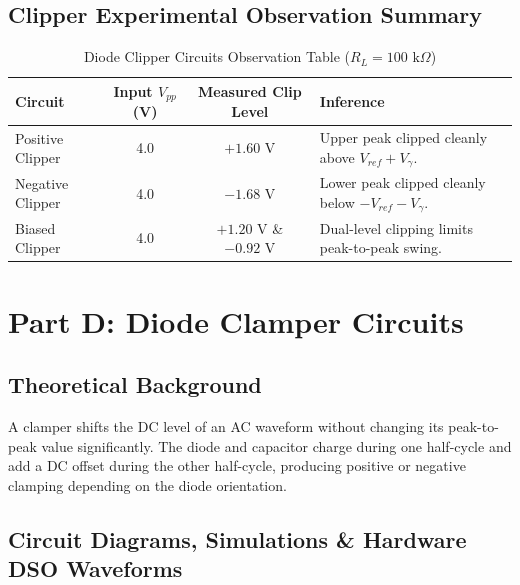 \documentclass[11pt,a4paper]{article}
\begin{document}
\subsection{Clipper Experimental Observation Summary}
\begin{table}[H]
\centering
\caption{Diode Clipper Circuits Observation Table ($R_L = 100\text{ k}\Omega$)}
\begin{tabular}{l c c l}
\toprule
\textbf{Circuit} & \textbf{Input $V_{pp}$ (V)} & \textbf{Measured Clip Level} & \textbf{Inference} \\
\midrule
Positive Clipper & 4.0 & $+1.60\text{ V}$ & Upper peak clipped cleanly above $V_{ref}+V_\gamma$. \\
Negative Clipper & 4.0 & $-1.68\text{ V}$ & Lower peak clipped cleanly below $-V_{ref}-V_\gamma$. \\
Biased Clipper   & 4.0 &  $+1.20\text{ V}$ \& $-0.92\text{ V}$ & Dual-level clipping limits peak-to-peak swing. \\
\bottomrule
\end{tabular}

\newpage

\end{table}
\section{Part D: Diode Clamper Circuits}
\subsection{Theoretical Background}
A clamper shifts the DC level of an AC waveform without changing its peak-to-peak value significantly. The diode and capacitor charge during one half-cycle and add a DC offset during the other half-cycle, producing positive or negative clamping depending on the diode orientation.
\subsection{Circuit Diagrams, Simulations \& Hardware DSO Waveforms}
\end{document}
